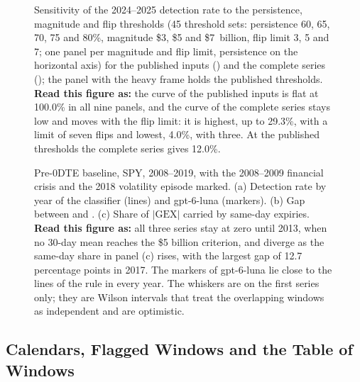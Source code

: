 \begin{figure}[H]
\centering
\resultfigure{\figThresholds}
\caption{Sensitivity of the 2024--2025 detection rate to the persistence, magnitude and flip thresholds (45 threshold sets: persistence 60, 65, 70, 75 and 80\%, magnitude \$3, \$5 and \$7~billion, flip limit 3, 5 and 7; one panel per magnitude and flip limit, persistence on the horizontal axis) for the published inputs () and the complete series (); the panel with the heavy frame holds the published thresholds. \textbf{Read this figure as:} the curve of the published inputs is flat at 100.0\% in all nine panels, and the curve of the complete series stays low and moves with the flip limit: it is highest, up to 29.3\%, with a limit of seven flips and lowest, 4.0\%, with three. At the published thresholds the complete series gives 12.0\%.}
\label{fig:thresholds}
\end{figure}

\begin{figure}[H]
\centering
\resultfigure{\figDeep}
\caption{Pre-0DTE baseline, SPY, 2008--2019, with the 2008--2009 financial crisis and the 2018 volatility episode marked. (a) Detection rate by year of the classifier (lines) and gpt-6-luna (markers). (b) Gap between  and . (c) Share of $|\mathrm{GEX}|$ carried by same-day expiries. \textbf{Read this figure as:} all three series stay at zero until 2013, when no 30-day mean reaches the \$5 billion criterion, and diverge as the same-day share in panel (c) rises, with the largest gap of 12.7 percentage points in 2017. The markers of gpt-6-luna lie close to the lines of the rule in every year. The whiskers are on the first series only; they are Wilson intervals that treat the overlapping windows as independent and are optimistic.}
\label{fig:deep}
\end{figure}

\subsection{Calendars, Flagged Windows and the Table of Windows}
\label{sup:detail:windows}

